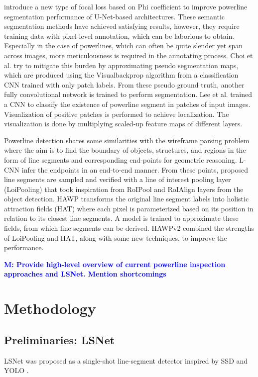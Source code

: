 \documentclass[journal]{IEEEtran}
\newcommand{\commentM}[1]{\textbf{\textcolor{blue}{M: #1}}}
\begin{document}
introduce a new type of focal loss based on Phi coefficient \cite{phi_coeff} to improve powerline segmentation performance of U-Net\cite{unet}-based architectures. These semantic segmentation methods have achieved satisfying results, however, they require training data with pixel-level annotation, which can be laborious to obtain. Especially in the case of powerlines, which can often be quite slender yet span across images, more meticulousness is required in the annotating process. Choi et al. \cite{related_work_hyeyeon_choi_2021} try to mitigate this burden by approximating pseudo segmentation maps, which are produced using the Visualbackprop algorithm \cite{vbp} from a classification CNN trained with only patch labels. From these pseudo ground truth, another fully convolutional network is trained to perform segmentation. Lee et al. \cite{related_work_sang_jun_lee_2017} trained a CNN to classify the existence of powerline segment in patches of input images. Visualization of positive patches is performed to achieve localization. The visualization is done by multiplying scaled-up feature maps of different layers.

Powerline detection shares some similarities with the wireframe parsing problem where the aim is to find the boundary of objects, structures, and regions in the form of line segments and corresponding end-points for geometric reasoning. L-CNN \cite{lcnn} infer the endpoints in an end-to-end manner. From these points, proposed line segments are sampled and verified with a line of interest pooling layer (LoiPooling) that took inspiration from RoIPool \cite{fastrcnn} and RoIAlign \cite{maskrcnn} layers from the object detection. HAWP \cite{hawp} transforms the original line segment labels into holistic attraction fields (HAT) where each pixel is parameterized based on its position in relation to its closest line segments. A model is trained to approximate these fields, from which line segments can be derived. HAWPv2 \cite{hawpv2} combined the strengths of LoiPooling and HAT, along with some new techniques, to improve the performance.  

\commentM{Provide high-level overview of current powerline inspection approaches and LSNet. Mention shortcomings}

\section{Methodology}

\subsection{Preliminaries: LSNet}
LSNet \cite{Nguyen2020} was proposed as a single-shot line-segment detector inspired by SSD \cite{SSD} and YOLO \cite{YOLO}. 
\end{document}
